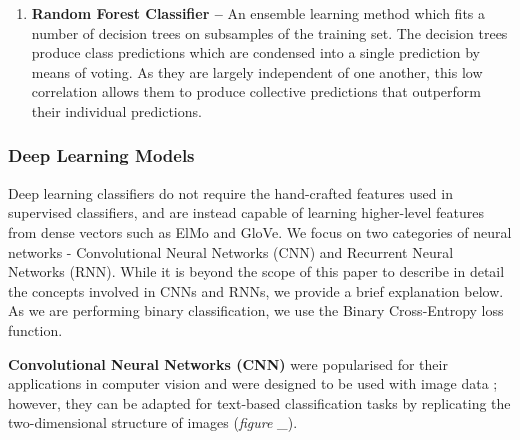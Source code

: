 \documentclass[12pt,a4paper]{article}
\begin{document}
\begin{enumerate}
	\item \textbf{Random Forest Classifier --}
	An ensemble learning method which fits a number of decision trees on subsamples of the training set. The decision trees produce class predictions which are condensed into a single prediction by means of voting. As they are largely independent of one another, this low correlation allows them to produce collective predictions that outperform their individual predictions.
\end{enumerate}


\subsubsection{Deep Learning Models}
Deep learning classifiers do not require the  hand-crafted features used in supervised classifiers, and are instead capable of learning higher-level features from dense vectors such as ElMo and GloVe. We focus on two categories of neural networks - Convolutional Neural Networks (CNN) and Recurrent Neural Networks (RNN). While it is beyond the scope of this paper to describe in detail the concepts involved in CNNs and RNNs, we provide a brief explanation below. As we are performing binary classification, we use the Binary Cross-Entropy loss function.\\\vspace{-5pt}

\noindent \textbf{Convolutional Neural Networks (CNN)}\cite{lecun1998gradient} were popularised for their applications in computer vision and were designed to be used with image data \cite{krizhevsky2012imagenet}; however, they can be adapted for text-based classification tasks by replicating the two-dimensional structure of images (\textit{figure \_}).\vspace{-5pt}
\end{document}

